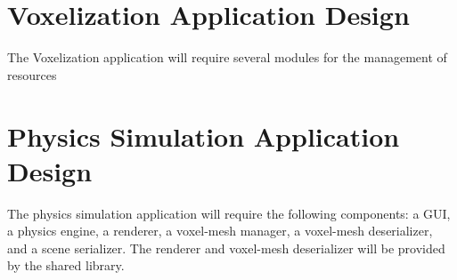\section{Voxelization Application Design}

The Voxelization application will require several modules for the management of resources 







\section{Physics Simulation Application Design}

The physics simulation application will require the following components: a GUI, a physics 
engine, a renderer, a voxel-mesh manager, a voxel-mesh deserializer, and a scene serializer. The 
renderer and voxel-mesh deserializer will be provided by the shared library.

